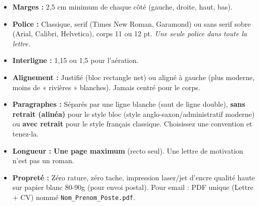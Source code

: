 \documentclass[11pt]{article}
\begin{document}
\begin{propriete}
\begin{itemize}
    \item \textbf{Marges :} 2,5 cm minimum de chaque côté (gauche, droite, haut, bas).
    \item \textbf{Police :} Classique, serif (Times New Roman, Garamond) ou sans serif sobre (Arial, Calibri, Helvetica), corps 11 ou 12 pt. \emph{Une seule police dans toute la lettre.}
    \item \textbf{Interligne :} 1,15 ou 1,5 pour l'aération.
    \item \textbf{Alignement :} Justifié (bloc rectangle net) ou aligné à gauche (plus moderne, moins de « rivières » blanches). Jamais centré pour le corps.
    \item \textbf{Paragraphes :} Séparés par une ligne blanche (saut de ligne double), \textbf{sans retrait (alinéa)} pour le style bloc (style anglo-saxon/administratif moderne) ou \textbf{avec retrait} pour le style français classique. Choisissez une convention et tenez-la.
    \item \textbf{Longueur :} \textbf{Une page maximum} (recto seul). Une lettre de motivation n'est pas un roman.
    \item \textbf{Propreté :} Zéro rature, zéro tache, impression laser/jet d'encre qualité haute sur papier blanc 80-90g (pour envoi postal). Pour email : PDF unique (Lettre + CV) nommé \texttt{Nom\_Prenom\_Poste.pdf}.
\end{itemize}
\end{propriete}
\end{document}
